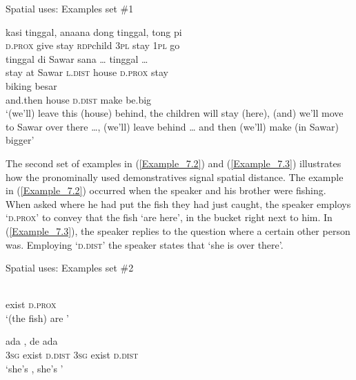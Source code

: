 {\begin{styleExampleTitle}
Spatial uses: Examples set \#1
\end{styleExampleTitle}

\ea
\label{Example_7.1}
 {{kasi}} {{tinggal,}} {{ana{\Tilde}ana}} {{dong}} {{tinggal,}} {tong} {pi}\\ %
 {\textsc{d.prox}}  {give}  {stay}  {\textsc{rdp}{\Tilde}child}  {\textsc{3pl}}  {stay}  \textsc{1pl}  go\\
\gll tinggal  {di}  {Sawar}  {sana}  {\ldots}  {}  {}  {tinggal}  {\ldots}\\
 stay  {at}  {Sawar}  {\textsc{l.dist}}   { }  {house}  {\textsc{d.prox}}  {stay}  \\
  {}  {}  {biking}  {besar}\\
 {and.then}  {house}  {\textsc{d.dist}}  {make}  {be.big}\\
\glt 
‘(we’ll) leave this (house) behind, the children will stay (here), (and) we’ll move to Sawar over there \ldots, (we’ll) leave  behind {\ldots} and then (we’ll) make  (in Sawar) bigger’ \textstyleExampleSource{[081110-001-Cv.0012/0022/0025/0027]}
\z


The second set of examples in (\ref{Example_7.2}) and (\ref{Example_7.3}) illustrates how the pronominally used demonstratives signal spatial distance. The example in (\ref{Example_7.2}) occurred when the speaker and his brother were fishing. When asked where he had put the fish they had just caught, the speaker employs  ‘\textsc{d.prox}’ to convey that the fish  ‘are here’, in the bucket right next to him. In (\ref{Example_7.3}), the speaker replies to the question where a certain other person was. Employing  ‘\textsc{d.dist}’ the speaker states that  ‘she is over there’.


\begin{styleExampleTitle}
Spatial uses: Examples set \#2
\end{styleExampleTitle}

\ea
\label{Example_7.2}
 {}\\ %
 exist  \textsc{d.prox}\\
 ‘(the fish) are ’ \textstyleExampleSource{[080917-006-CvHt.0005]}
\z

\ea
\label{Example_7.3}
 {ada} {,} {de} {ada} {}\\ %
 \textsc{3sg}  exist  \textsc{d.dist}  \textsc{3sg}  exist  \textsc{d.dist}\\
 ‘she’s , she’s ’ \textstyleExampleSource{[081025-009b-Cv.0006]}
\z



}

